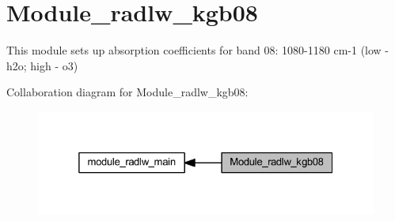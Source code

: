 \hypertarget{group__module__radlw__kgb08}{}\section{Module\+\_\+radlw\+\_\+kgb08}
\label{group__module__radlw__kgb08}


This module sets up absorption coefficients for band 08\+: 1080-\/1180 cm-\/1 (low -\/ h2o; high -\/ o3)  


Collaboration diagram for Module\+\_\+radlw\+\_\+kgb08\+:\nopagebreak
\begin{figure}[H]
\begin{center}
\leavevmode
\includegraphics[width=325pt]{group__module__radlw__kgb08}
\end{center}
\end{figure}

